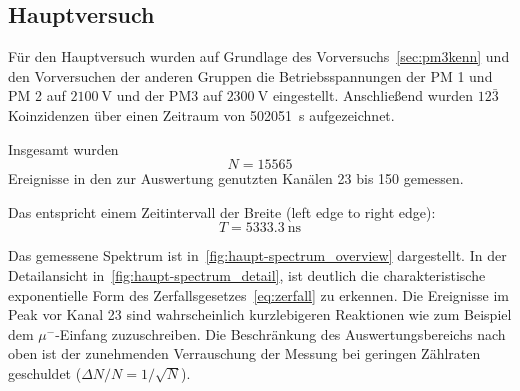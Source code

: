 \documentclass[slug=LM, room=Andreas-Schubert-Bau\,\ K\ 1A, supervisor=Anne-Sophie\ Berthold, coursedate=13.\ 12.\ 2019]{../../Lab_Report_LaTeX/lab_report}
\begin{document}
%
%

\subsection{Hauptversuch}
\label{sec:hauptversuch}

F\"ur den Hauptversuch wurden auf Grundlage des
Vorversuchs~\ref{sec:pm3kenn} und den Vorversuchen der anderen Gruppen
die Betriebsspannungen der PM 1 und PM 2 auf \(\SI{2100}{\volt}\) und der
PM3 auf \(\SI{2300}{\volt}\) eingestellt. Anschließend wurden
\(\textit{12}\bar{\textit{3}}\) Koinzidenzen \"uber einen Zeitraum von
\SI{502051}{\second} aufgezeichnet.

Insgesamt wurden
\begin{equation}
  \label{eq:totalcount}
  N=15565
\end{equation}
Ereignisse in den zur Auswertung genutzten Kan\"alen 23 bis 150
gemessen.

Das entspricht einem Zeitintervall der Breite (left edge to right
edge):
\begin{equation}
  \label{eq:totalwidth}
  T = \SI{5333.3}{\nano\second}
\end{equation}

Das gemessene Spektrum ist
in~\ref{fig:haupt-spectrum_overview} dargestellt. In der
Detailansicht in~\ref{fig:haupt-spectrum_detail}, ist deutlich die
charakteristische exponentielle Form des
Zerfallsgesetzes~\ref{eq:zerfall} zu erkennen.
Die Ereignisse im Peak vor Kanal 23 sind wahrscheinlich kurzlebigeren
Reaktionen wie zum Beispiel dem \(\mu^{-}\)-Einfang zuzuschreiben. Die
Beschr\"ankung des Auswertungsbereichs nach oben ist der zunehmenden
Verrauschung der Messung bei geringen Z\"ahlraten geschuldet (\(\Delta
N/N=1/\sqrt{N}\)).
\end{document}
